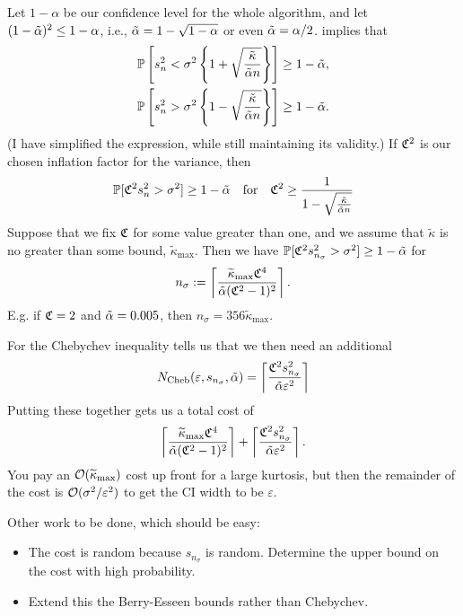 \documentclass{amsart}
\newcommand{\tkappa}{\widetilde{\kappa}}
\newcommand{\tkmax}{\tkappa_{\max}}
\begin{document}
Let $1-\alpha$ be our confidence level for the whole algorithm, and let $(1 - \tilde{\alpha})^2 \le 1 - \alpha$, i.e., $\tilde{\alpha} = 1 - \sqrt{1-\alpha}$ or even $\tilde{\alpha} = \alpha/2$.   \citet[(12)]{HicEtal14a} implies that 
\begin{subequations} \label{sampvarbd}
	\begin{gather}\label{sampvarup}
		\operatorname{\mathbb{P}}\left[s^2_n < \sigma^2 \left\{1 + \sqrt{\frac{\tilde\kappa}{\tilde{\alpha} n}}\right\} \right] \ge 1 - \tilde{\alpha}, \\
		\label{sampvarlo}
		\operatorname{\mathbb{P}}\left[s^2_n > \sigma^2 \left\{1 - \sqrt{\frac{\tilde\kappa}{\tilde{\alpha} n}}\right\} \right] \ge 1 - \tilde{\alpha}.
	\end{gather}
\end{subequations}
(I have simplified the expression, while still maintaining its validity.)  If $\mathfrak{C}^2$ is our chosen inflation factor for the variance, then 
\begin{equation}
\label{sampvarlo_b}
\operatorname{\mathbb{P}}[\mathfrak{C}^2 s^2_n > \sigma^2] \ge 1 - \tilde{\alpha} \quad \text{for}  \quad \mathfrak{C}^2 \ge \frac{1}{1 - \sqrt{\frac{\tilde\kappa }{\tilde{\alpha} n}}} 
\end{equation}
Suppose that we fix $\mathfrak{C}$ for some value greater than one, and we assume that $\tkappa$ is no greater than some bound, $\tkmax$.  Then we have $\operatorname{\mathbb{P}}[\mathfrak{C}^2 s^2_{n_\sigma}> \sigma^2] \ge 1 - \tilde{\alpha} $ for  
\begin{equation}
	n_\sigma := \left \lceil \frac{\tkmax\fC^4}{\talpha(\fC^2-1)^2} \right \rceil.
\end{equation}
E.g. if $\mathfrak{C} = 2$ and $\tilde{\alpha} = 0.005$, then $n_\sigma = 356 \tkmax$.

For the Chebychev inequality \citet[(14)]{HicEtal14a} tells us that we then need an additional 
\[
N_{\text{Cheb}}(\varepsilon,s_{n_\sigma},\tilde{\alpha})
= 
\left\lceil\frac{\mathfrak{C}^2s_{n_\sigma}^2}{\tilde{\alpha}\varepsilon^2}\right\rceil
\]
Putting these together gets us a total cost of 
\[
\left \lceil \frac{\tkmax\fC^4}{\talpha(\fC^2-1)^2} \right \rceil + \left\lceil\frac{\fC^2s_{n_\sigma}^2}{\talpha\varepsilon^2}\right\rceil.
\]
You pay an $\Order(\tkmax)$ cost up front for a large kurtosis, but then the remainder of the cost is $\operatorname{{\mathcal O}}(\sigma^2/\varepsilon^2)$ to get the CI width to be $\varepsilon$.

Other work to be done, which should be easy:
\begin{itemize}
	\item The cost is random because $s_{n_\sigma}$ is random.  Determine the upper bound on the cost with high probability.  
	\item Extend this the Berry-Esseen bounds rather than Chebychev.
\end{itemize}



\end{document}
